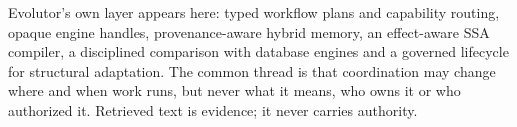 Evolutor's own layer appears here: typed workflow plans and capability routing, opaque engine handles, provenance-aware hybrid memory, an effect-aware SSA compiler, a disciplined comparison with database engines and a governed lifecycle for structural adaptation. The common thread is that coordination may change where and when work runs, but never what it means, who owns it or who authorized it. Retrieved text is evidence; it never carries authority.
